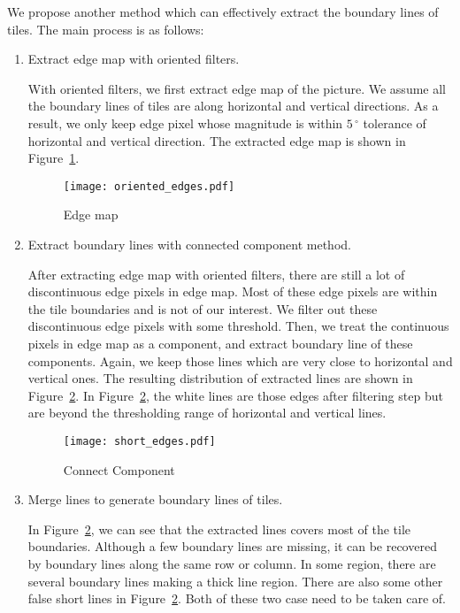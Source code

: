 We propose another method which can effectively extract the boundary lines of
 tiles. The main process is as follows:
\begin{enumerate}
	\item Extract edge map with oriented filters.
	
			With oriented filters, we first extract edge map of the 
			picture. We assume all the boundary lines of tiles are along horizontal 
			and vertical directions. As a result, we only keep edge pixel whose 
			magnitude is within $5\,^{\circ}$ tolerance of horizontal and vertical direction. 
			The extracted edge map is shown in Figure~\ref{Edge_map}.
			
			\begin{figure}[htbp]
				  \centering
				  \texttt{[image: oriented\_edges.pdf]}
				  \caption{Edge map}
				  \label{Edge_map}
			\end{figure}
			
	\item Extract boundary lines with connected component method.
	
			After extracting edge map with oriented filters, there are still a lot of 
			discontinuous edge pixels in edge map. Most of these edge pixels are within 
			the tile boundaries and is not of our interest. We filter out these 
			discontinuous edge pixels with some threshold. Then, we treat the continuous 
			pixels in edge map as a component, and extract boundary line of these components.
			Again, we keep those lines which are very close to horizontal and vertical ones.
			The resulting distribution of extracted lines are shown in Figure~\ref{Connect}.
			In Figure~\ref{Connect}, the white lines are those edges after filtering step but 
			are beyond the thresholding range of horizontal and vertical lines.
			
			 \begin{figure}[htbp]
				  \centering
				  \texttt{[image: short\_edges.pdf]}
				  \caption{Connect Component}
				  \label{Connect}
			\end{figure}
			
	\item  Merge lines to generate boundary lines of tiles.
			
			In Figure~\ref{Connect}, we can see that the extracted lines covers most of the tile 
			boundaries. Although a few boundary lines are missing, it can be recovered by boundary 
			lines along the same row or column. In some region, there are several 
			boundary lines making a thick line region. There are also some other false 
			short lines in Figure~\ref{Connect}. Both of these two case need to be taken care of. 
			

\end{enumerate}
